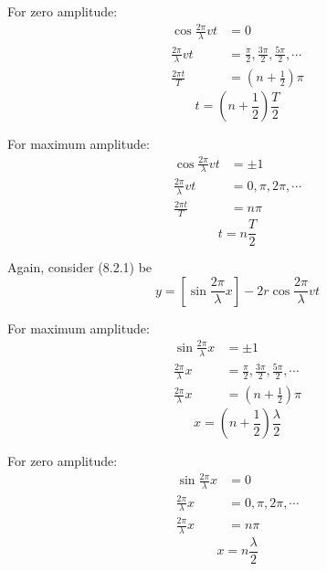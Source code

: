 \documentclass[12pt]{article}
\numberwithin{equation}{subsection}
\begin{document}
\begin{minipage}{0.45\textwidth}
    For zero amplitude:
    \begin{align*}
        \cos{\frac{2\pi}{\lambda}vt} &= 0 \\
        \frac{2\pi}{\lambda}vt &= \frac{\pi}{2}, \frac{3\pi}{2}, \frac{5\pi}{2}, \cdots \\
        \frac{2\pi t}{T} &= \left(n + \frac{1}{2}\right)\pi
    \end{align*}
    \begin{equation}
        \boxed{ t = \left( n + \frac{1}{2} \right) \frac{T}{2} }
    \end{equation}
\end{minipage}
\begin{minipage}{0.45\textwidth}
    For maximum amplitude:
    \begin{align*}
        \cos{\frac{2\pi}{\lambda}vt} &= \pm 1 \\
        \frac{2\pi}{\lambda}vt &= 0, \pi, 2\pi, \cdots \\
        \frac{2\pi t}{T} &= n\pi
    \end{align*}
    \begin{equation}
        \boxed{ t = n \frac{T}{2} }
    \end{equation}
\end{minipage}

\vspace{30pt}
Again, consider (8.2.1) be
\begin{equation}
    y = \left[ \sin{\frac{2\pi}{\lambda}x} \right] - 2r \cos{\frac{2\pi}{\lambda}vt}
\end{equation}

\begin{minipage}{0.45\textwidth}
    For maximum amplitude:
    \begin{align*}
        \sin{\frac{2\pi}{\lambda}x} &= \pm 1 \\
        \frac{2\pi}{\lambda}x &= \frac{\pi}{2}, \frac{3\pi}{2}, \frac{5\pi}{2}, \cdots \\
        \frac{2\pi}{\lambda} x &= \left( n + \frac{1}{2} \right) \pi
    \end{align*}
    \begin{equation}
        \boxed{ x = \left( n + \frac{1}{2} \right) \frac{\lambda}{2} }
    \end{equation}
\end{minipage}
\begin{minipage}{0.45\textwidth}
    For zero amplitude:
    \begin{align*}
        \sin{\frac{2\pi}{\lambda}x} &= 0 \\
        \frac{2\pi}{\lambda}x &= 0, \pi, 2\pi, \cdots \\
        \frac{2\pi}{\lambda} x &= n\pi
    \end{align*}
    \begin{equation}
        \boxed{ x = n \frac{\lambda}{2} }
    \end{equation}
\end{minipage}
\end{document}
